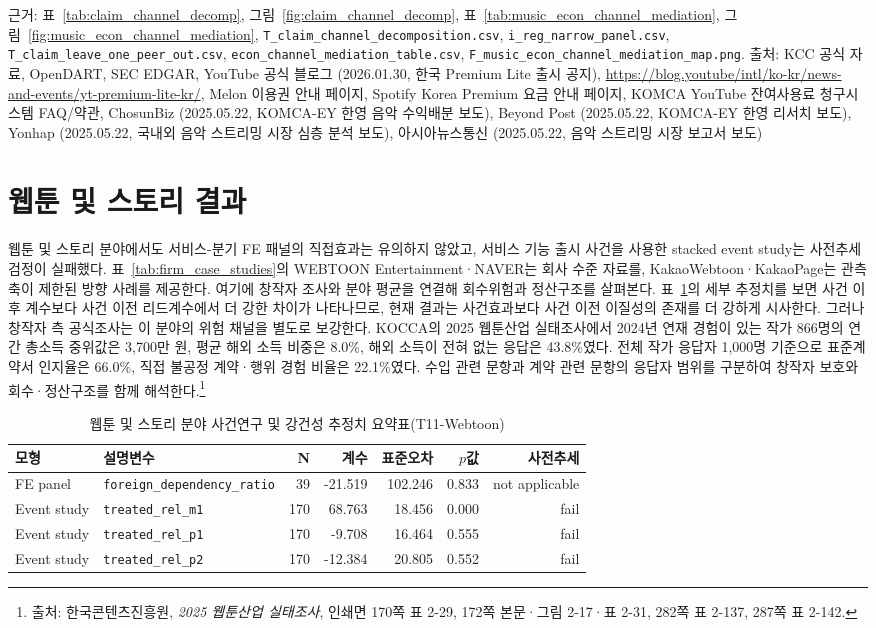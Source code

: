 \documentclass[11pt,a4paper]{report}
\newcommand{\sourcefootnote}[1]{\footnote{출처: #1}}
\newcommand{\srcYouTubeLite}{YouTube 공식 블로그 (2026.01.30, 한국 Premium Lite 출시 공지), \url{https://blog.youtube/intl/ko-kr/news-and-events/yt-premium-lite-kr/}}
\newcommand{\srcSpotifyKR}{Spotify Korea Premium 요금 안내 페이지}
\newcommand{\srcMelonPass}{Melon 이용권 안내 페이지}
\newcommand{\srcKOMCAResidual}{KOMCA YouTube 잔여사용료 청구시스템 FAQ/약관}
\newcommand{\srcChosunBizKOMCA}{ChosunBiz (2025.05.22, KOMCA-EY 한영 음악 수익배분 보도)}
\newcommand{\srcBeyondPostKOMCA}{Beyond Post (2025.05.22, KOMCA-EY 한영 리서치 보도)}
\newcommand{\srcYonhapKOMCA}{Yonhap (2025.05.22, 국내외 음악 스트리밍 시장 심층 분석 보도)}
\newcommand{\srcAnewsKOMCA}{아시아뉴스통신 (2025.05.22, 음악 스트리밍 시장 보고서 보도)}
\begin{document}
{\par\raggedright\small 근거: 표~\ref{tab:claim_channel_decomp}, 그림~\ref{fig:claim_channel_decomp}, 표~\ref{tab:music_econ_channel_mediation}, 그림~\ref{fig:music_econ_channel_mediation}, \nolinkurl{T_claim_channel_decomposition.csv}, \nolinkurl{i_reg_narrow_panel.csv}, \nolinkurl{T_claim_leave_one_peer_out.csv}, \nolinkurl{econ_channel_mediation_table.csv}, \nolinkurl{F_music_econ_channel_mediation_map.png}. 출처: KCC 공식 자료, OpenDART, SEC EDGAR, \srcYouTubeLite, \srcMelonPass, \srcSpotifyKR, \srcKOMCAResidual, \srcChosunBizKOMCA, \srcBeyondPostKOMCA, \srcYonhapKOMCA, \srcAnewsKOMCA\par}



\section{웹툰 및 스토리 결과}
웹툰 및 스토리 분야에서도 서비스-분기 FE 패널의 직접효과는 유의하지 않았고, 서비스 기능 출시 사건을 사용한 stacked event study는 사전추세 검정이 실패했다. 표~\ref{tab:firm_case_studies}의 WEBTOON Entertainment·NAVER는 회사 수준 자료를, KakaoWebtoon·KakaoPage는 관측축이 제한된 방향 사례를 제공한다. 여기에 창작자 조사와 분야 평균을 연결해 회수위험과 정산구조를 살펴본다. 표~\ref{tab:results_webtoon_estimates}의 세부 추정치를 보면 사건 이후 계수보다 사건 이전 리드계수에서 더 강한 차이가 나타나므로, 현재 결과는 사건효과보다 사건 이전 이질성의 존재를 더 강하게 시사한다. 그러나 창작자 측 공식조사는 이 분야의 위험 채널을 별도로 보강한다. KOCCA의 2025 웹툰산업 실태조사에서 2024년 연재 경험이 있는 작가 866명의 연간 총소득 중위값은 3,700만 원, 평균 해외 소득 비중은 8.0\%, 해외 소득이 전혀 없는 응답은 43.8\%였다. 전체 작가 응답자 1,000명 기준으로 표준계약서 인지율은 66.0\%, 직접 불공정 계약·행위 경험 비율은 22.1\%였다. 수입 관련 문항과 계약 관련 문항의 응답자 범위를 구분하여 창작자 보호와 회수·정산구조를 함께 해석한다.\sourcefootnote{한국콘텐츠진흥원, \textit{2025 웹툰산업 실태조사}, 인쇄면 170쪽 표 2-29, 172쪽 본문·그림 2-17·표 2-31, 282쪽 표 2-137, 287쪽 표 2-142.}

\begin{table}[H]
\centering
\small
\caption{웹툰 및 스토리 분야 사건연구 및 강건성 추정치 요약표(T11-Webtoon)}
\label{tab:results_webtoon_estimates}
\begin{tabular}{llrrrrr}
\toprule
\rowcolor{ReportTableHead}
모형 & 설명변수 & N & 계수 & 표준오차 & $p$값 & 사전추세 \\
\midrule
FE panel & \texttt{foreign\_dependency\_ratio} & 39 & -21.519 & 102.246 & 0.833 & not applicable \\
Event study & \texttt{treated\_rel\_m1} & 170 & 68.763 & 18.456 & 0.000 & fail \\
Event study & \texttt{treated\_rel\_p1} & 170 & -9.708 & 16.464 & 0.555 & fail \\
Event study & \texttt{treated\_rel\_p2} & 170 & -12.384 & 20.805 & 0.552 & fail \\
\bottomrule
\end{tabular}
\end{table}
\end{document}
